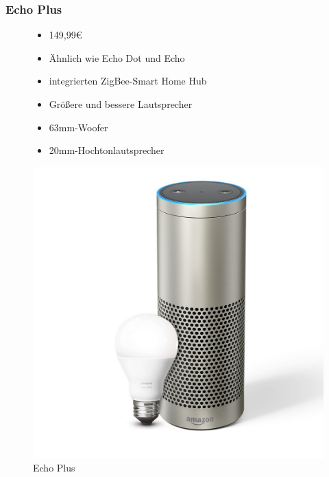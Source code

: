 \subsubsection{Echo Plus}
\begin{figure}[H]
	\begin{minipage}{0.45\textwidth}
		\begin{itemize}
			\item 149,99€
			\item Ähnlich wie Echo Dot und Echo
			\item integrierten ZigBee-Smart Home Hub
			\item Größere und bessere Lautsprecher
			\item 63mm-Woofer
			\item 20mm-Hochtonlautsprecher
		\end{itemize}
	\end{minipage}
	\hfill
	\begin{minipage}{0.45\textwidth}
		\centering
		\includegraphics[width=\textwidth]{content/img/echoplus}
		\caption[Echo Plus]{Echo Plus}
	\end{minipage}
\end{figure}

